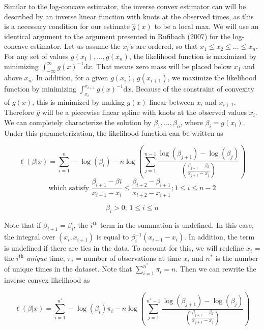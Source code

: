 \documentclass[11pt]{article}
\numberwithin{equation}{section}
\begin{document}
	Similar to the log-concave estimator, the inverse convex estimator can  will be described by an inverse linear function with knots at the observed times, as this is a necessary condition for our estimate $\hat g(x)$ to be a local max. We will use an identical argument to the argument  presented in Rufibach (2007) for the log-concave estimator. Let us assume the $x_i$'s are ordered, so that $x_1 \leq x_2 \leq ... \leq x_n$. For any set of values $g(x_1), ... ,g(x_n)$, the likelihood function is maximized by minimizing $\displaystyle \int_{-\infty}^{\infty} g(x)^{-1} \mathrm{d}x$. That means zero mass will be placed below $x_1$ and above $x_n$. In addition, for a given $g(x_i)$, $g(x_{i+1}) $, we maximize the likelihood function by minimizing $\displaystyle \int_{x_i}^{x_{i+1} } g(x)^{-1} \mathrm{d} x $. Because of the constraint of convexity of $g(x)$, this is minimized by making $g(x)$ linear between $x_i$ and $x_{i+1}$. Therefore $\hat g$ will be a piecewise linear spline with knots at the observed values $x_i$. We can completely characterize the solution by $\beta_1,...,\beta_n$, where $\beta_i = g(x_i)$. Under this parameterization, the likelihood function can be written as
	
	\[
	 \ell(\beta | x) = \displaystyle \sum_{i = 1}^n -\log(\beta_i) - n \log \left( \displaystyle \sum_{j=1}^{n-1} \frac{ \log (\beta_{j+1}) - \log (\beta_j) }  { \left( \frac{ \beta_{j+1} - \beta{j} } {x_{j+1} - x_j} \right) } \right)
	\]
	\[
	\text{which satisfy } \frac{\beta_{i+1} - \beta{i} } {x_{i+1} - x_{i} } \leq \frac{\beta_{i+2} - \beta_{i+1}} {x_{i+2} - x_{i+1} }; 1 \leq i \leq n - 2
	\]

	\[\beta_i > 0 \text{; } 1 \leq i \leq n \]

	Note that if $\beta_{i+1} = \beta_i$, the $i^{\mathrm{th} } $ term in the summation is undefined. In this case, the integral over $(x_i, x_{i+1})$ is equal to  $\beta_i^{-1} (x_{i+1} - x_i)$. In addition, the term is undefined if there are ties in the data. To account for this, we will redefine $x_i$ = the $i^{\mathrm{th} } $ \emph{unique} time, $\pi_i$ = number of observations at time $x_i$ and $n^*$ is the number of unique times in the dataset. Note that $\sum_{i = 1}^{n^*} \pi_i = n$. Then we can rewrite the inverse convex likelihood as 
	
	\[
	 \ell(\beta | x) = \displaystyle \sum_{i = 1}^{n^*} -\log(\beta_i)\pi_i - n \log \left( \displaystyle \sum_{j=1}^{n^*-1} \frac{ \log (\beta_{j+1}) - \log (\beta_j) }  { \left( \frac{ \beta_{j+1} - \beta{j} } {x_{j+1} - x_j} \right) } \right)
	\]
\end{document}
